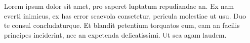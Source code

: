 \documentclass[12pt]{article}
\begin{document}
Lorem ipsum dolor sit amet, pro saperet luptatum repudiandae an. 
Ex nam everti inimicus, ex has error scaevola consetetur, pericula molestiae ut usu. 
Duo te consul concludaturque.
Et blandit petentium torquatos eum, eam an facilis principes inciderint, nec an expetenda delicatissimi. 
Ut sea agam laudem. 
\end{document}
